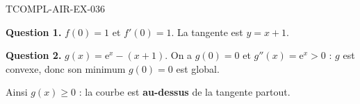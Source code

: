 \begin{corrige}{TCOMPL-AIR-EX-036}

\textbf{Question 1.} $f(0) = 1$ et $f'(0) = 1$. La tangente est $y = x + 1$.


\textbf{Question 2.} $g(x) = \mathrm{e}^x - (x+1)$. On a $g(0)=0$ et $g''(x) = \mathrm{e}^x > 0$ : $g$ est convexe, donc son minimum $g(0)=0$ est global.

Ainsi $g(x) \geq 0$ : la courbe est \textbf{au-dessus} de la tangente partout.

\end{corrige}
